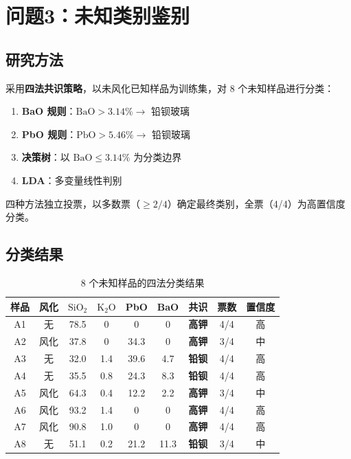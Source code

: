 \section{问题3：未知类别鉴别}

\subsection{研究方法}

采用\textbf{四法共识策略}，以未风化已知样品为训练集，对 8 个未知样品进行分类：

\begin{enumerate}[label=(\arabic*)]
    \item \textbf{BaO 规则}：$\text{BaO} > 3.14\% \rightarrow$ 铅钡玻璃
    \item \textbf{PbO 规则}：$\text{PbO} > 5.46\% \rightarrow$ 铅钡玻璃
    \item \textbf{决策树}：以 $\text{BaO} \leq 3.14\%$ 为分类边界
    \item \textbf{LDA}：多变量线性判别
\end{enumerate}

四种方法独立投票，以多数票（$\geq 2/4$）确定最终类别，全票（4/4）为高置信度分类。

\subsection{分类结果}

\begin{table}[H]
    \centering
    \caption{8 个未知样品的四法分类结果}
    \label{tab:classification}
    \begin{tabular}{c c c c c c c c c}
        \toprule
        \textbf{样品} & \textbf{风化} & \textbf{$\text{SiO}_2$} & \textbf{$\text{K}_2\text{O}$} & \textbf{PbO} & \textbf{BaO} & \textbf{共识} & \textbf{票数} & \textbf{置信度} \\
        \midrule
        A1 & 无 & 78.5 & 0 & 0 & 0 & \textbf{高钾} & 4/4 & 高 \\
        A2 & 风化 & 37.8 & 0 & 34.3 & 0 & \textbf{高钾} & 3/4 & 中 \\
        A3 & 无 & 32.0 & 1.4 & 39.6 & 4.7 & \textbf{铅钡} & 4/4 & 高 \\
        A4 & 无 & 35.5 & 0.8 & 24.3 & 8.3 & \textbf{铅钡} & 4/4 & 高 \\
        A5 & 风化 & 64.3 & 0.4 & 12.2 & 2.2 & \textbf{高钾} & 3/4 & 中 \\
        A6 & 风化 & 93.2 & 1.4 & 0 & 0 & \textbf{高钾} & 4/4 & 高 \\
        A7 & 风化 & 90.8 & 1.0 & 0 & 0 & \textbf{高钾} & 4/4 & 高 \\
        A8 & 无 & 51.1 & 0.2 & 21.2 & 11.3 & \textbf{铅钡} & 3/4 & 中 \\
        \bottomrule
    \end{tabular}
\end{table}

